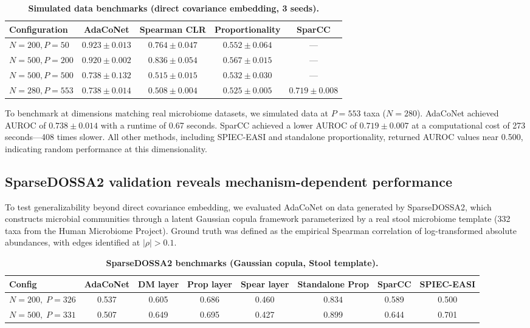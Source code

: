 \documentclass[fleqn]{nature}
\begin{document}
\begin{table}[htbp]
\caption{\textbf{Simulated data benchmarks (direct covariance embedding, 3 seeds).}}
\label{tab:v4}
\centering
\begin{tabular}{lcccc}
\toprule
Configuration & AdaCoNet & Spearman CLR & Proportionality & SparCC \\
\midrule
$N=200, P=50$     & $\mathbf{0.923 \pm 0.013}$ & $0.764 \pm 0.047$ & $0.552 \pm 0.064$ & --- \\
$N=500, P=200$    & $\mathbf{0.920 \pm 0.002}$ & $0.836 \pm 0.054$ & $0.567 \pm 0.015$ & --- \\
$N=500, P=500$    & $\mathbf{0.738 \pm 0.132}$ & $0.515 \pm 0.015$ & $0.532 \pm 0.030$ & --- \\
$N=280, P=553$    & $\mathbf{0.738 \pm 0.014}$ & $0.508 \pm 0.004$ & $0.525 \pm 0.005$ & $0.719 \pm 0.008$ \\
\bottomrule
\end{tabular}
\end{table}

To benchmark at dimensions matching real microbiome datasets, we simulated data at $P = 553$ taxa ($N = 280$).
AdaCoNet achieved AUROC of $0.738 \pm 0.014$ with a runtime of 0.67 seconds.
SparCC achieved a lower AUROC of $0.719 \pm 0.007$ at a computational cost of 273 seconds---408 times slower.
All other methods, including SPIEC-EASI and standalone proportionality, returned AUROC values near 0.500, indicating random performance at this dimensionality.


\subsection*{SparseDOSSA2 validation reveals mechanism-dependent performance}

To test generalizability beyond direct covariance embedding, we evaluated AdaCoNet on data generated by SparseDOSSA2\cite{sparsedossa2}, which constructs microbial communities through a latent Gaussian copula framework parameterized by a real stool microbiome template (332 taxa from the Human Microbiome Project\cite{lloydprice2017}).
Ground truth was defined as the empirical Spearman correlation of log-transformed absolute abundances, with edges identified at $|\rho| > 0.1$.

\begin{table}[htbp]
\caption{\textbf{SparseDOSSA2 benchmarks (Gaussian copula, Stool template).}}
\label{tab:sdo}
\centering
\begin{tabular}{lccccccc}
\toprule
Config & AdaCoNet & DM layer & Prop layer & Spear layer & Standalone Prop & SparCC & SPIEC-EASI \\
\midrule
$N{=}200,\; P{=}326$ & 0.537 & 0.605 & 0.686 & 0.460 & $\mathbf{0.834}$ & 0.589 & 0.500 \\
$N{=}500,\; P{=}331$ & 0.507 & 0.649 & 0.695 & 0.427 & $\mathbf{0.899}$ & 0.644 & 0.701 \\
\bottomrule
\end{tabular}
\end{table}
\end{document}
